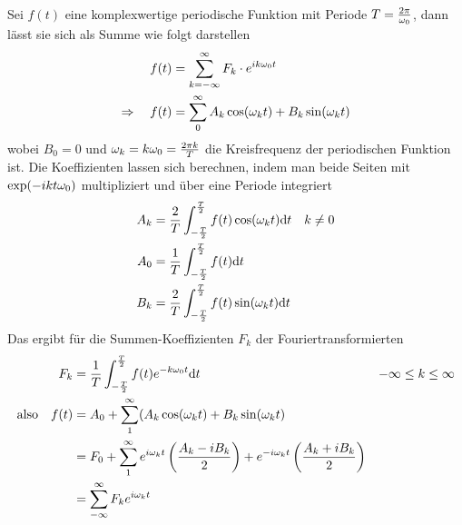Sei $f(t)$ eine komplexwertige periodische Funktion mit Periode
$T=\frac{2\pi}{\omega_0}$, dann lässt sie sich als Summe wie folgt darstellen
\begin{align*}
  f(t) &= \sum_{k=-\infty}^{\infty} F_k\cdot e^{ik\omega_0 t}\\
  \Rightarrow\quad 
  f(t) &= \sum_0^{\infty} A_k\cos(\omega_k t)+B_k\sin(\omega_k t)
\end{align*}
wobei $B_0=0$ und $\omega_k=k\omega_0=\frac{2\pi k}{T}$ die
Kreisfrequenz der periodischen Funktion ist. Die Koeffizienten lassen
sich berechnen, indem man beide Seiten mit $\exp(-ikt\omega_0)$
multipliziert und über eine Periode integriert
\begin{align*}
  A_k &= \frac{2}{T} \int_{-\frac{T}{2}}^{\frac{T}{2}}
        f(t)\cos(\omega_k t)\mathrm{d} t
  & k&\neq 0\\
  A_0 &= \frac{1}{T}\int_{-\frac{T}{2}}^{\frac{T}{2}} f(t)\mathrm{d} t\\
  B_k &= \frac{2}{T}\int_{-\frac{T}{2}}^{\frac{T}{2}}
        f(t)\sin(\omega_k t)\mathrm{d} t\\
\end{align*}
Das ergibt für die Summen-Koeffizienten $F_k$ der
Fouriertransformierten
\begin{align*}
  F_k &= \frac{1}{T}\int_{-\frac{T}{2}}^{\frac{T}{2}}
        f(t) e^{-k\omega_0 t}\mathrm{d} t
  &-\infty &\leq k\leq\infty\\
  \text{also}\quad 
  f(t) &= A_0 + \sum_{1}^{\infty}(A_k\cos(\omega_k t) + B_k\sin(\omega_k t)\\
      &= F_0 + \sum_{1}^{\infty}e^{i\omega_kt} 
        \left( \frac{A_k-iB_k}{2} \right)
        + e^{-i\omega_kt}\left( \frac{A_k+iB_k}{2} \right)\\
      &= \sum_{-\infty}^{\infty} F_k e^{i\omega_k t}
\end{align*}
